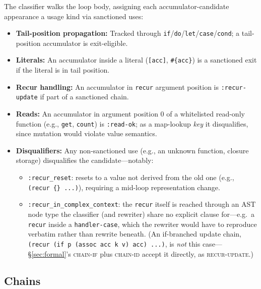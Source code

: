 \documentclass[sigplan,review,anonymous]{acmart}
\begin{document}
The classifier walks the loop body, assigning each accumulator-candidate appearance a usage kind via sanctioned uses:
\begin{itemize}
    \item \textbf{Tail-position propagation:} Tracked through \texttt{if}/\texttt{do}/\texttt{let}/\texttt{case}/\texttt{cond}; a tail-position accumulator is exit-eligible.
    \item \textbf{Literals:} An accumulator inside a literal (\texttt{[acc]}, \texttt{\#\{acc\}}) is a sanctioned exit if the literal is in tail position.
    \item \textbf{Recur handling:} An accumulator in \texttt{recur} argument position is \texttt{:recur-update} if part of a sanctioned chain.
    \item \textbf{Reads:} An accumulator in argument position 0 of a whitelisted read-only function (e.g., \texttt{get}, \texttt{count}) is \texttt{:read-ok}; as a map-lookup \emph{key} it disqualifies, since mutation would violate value semantics.
    \item \textbf{Disqualifiers:} Any non-sanctioned use (e.g., an unknown function, closure storage) disqualifies the candidate---notably:
    \begin{itemize}
        \item \texttt{:recur\_reset}: resets to a value not derived from the old one (e.g., \texttt{(recur \{\} ...)}), requiring a mid-loop representation change.
        \item \texttt{:recur\_in\_complex\_context}: the \texttt{recur} itself is reached through an AST node type the classifier (and rewriter) share no explicit clause for---e.g.\ a \texttt{recur} inside a \texttt{handler-case}, which the rewriter would have to reproduce verbatim rather than rewrite beneath. (An if-branched update chain, \texttt{(recur (if p (assoc acc k v) acc) ...)}, is \emph{not} this case---§\ref{sec:formal}'s \textsc{chain-if} plus \textsc{chain-id} accept it directly, as \textsc{recur-update}.)
    \end{itemize}
\end{itemize}

\subsection{Chains}
\label{sec:chains}
\end{document}
